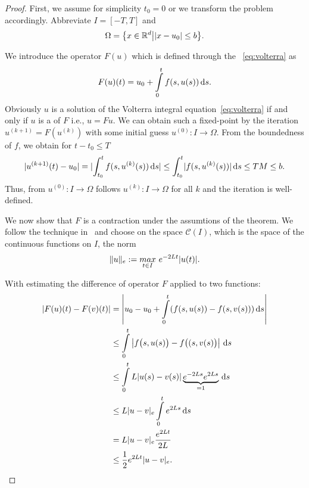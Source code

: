 

\begin{proof}
  First, we assume for simplicity $t_0=0$ or we transform the problem
  accordingly. Abbreviate $I = [-T,T]$ and
  \begin{gather*}
    \Omega = \bigl\{x\in \mathbb R^d\big| \lvert x-u_0\rvert \le b \bigr\}.
  \end{gather*}

  We introduce the operator $F(u)$ which is defined
  through the ~\eqref{eq:volterra} as
  \begin{gather}
    \label{eq:awa:16}
   F(u)(t) = u_0 + \int\limits_{0}^t f(s,u(s)) \,\mathrm{d} s.
  \end{gather}
  Obviously $u$ is a solution of the Volterra integral
  equation~\eqref{eq:volterra} if and only if $u$ is a  of $F$ i.e., $u=Fu$. We can obtain such a fixed-point by
  the iteration $u^{(k+1)} = F(u^{(k)})$ with some initial guess
  $u^{(0)}:I\to\Omega$. From the boundedness of $f$, we obtain for
  $t-t_0 \le T$
  \begin{align*}
    \lvert u^{(k+1)}(t)-u_0\rvert = \lvert\int_{t_0}^t f(s,u^{(k)}(s))\,\mathrm{d} s\rvert \le \int_{t_0}^t
    \lvert f(s,u^{(k)}(s))\rvert\,\mathrm{d} s \le TM \le b.
  \end{align*}
  Thus, from $u^{(0)}:I\to\Omega$ follows $u^{(k)}:I\to\Omega$ for all
  $k$ and the iteration is well-defined.
  
  We now show that $F$ is a contraction under the assumtions of the
  theorem. We follow the technique
  in~\cite[\S117]{Heuser86} and choose on the space $\mathcal C(I)$,
  which is the space of the continuous functions on $I$, the norm
  \begin{gather*}
    \lVert u\rVert_e := \underset{t \in I}{max} ~e^{-2 L t} |u(t)|.
  \end{gather*}
  
  With estimating the difference of operator $F$ applied to two functions:
  \begin{align*}
    |F(u)(t) - F(v)(t)|
    & = \left| u_0 - u_0 + \int\limits_{0}^t (f(s,u(s)) - f(s,v(s))) \,\mathrm{d} s \right| \\
    & \le \int\limits_{0}^t \left| f\bigl(s,u(s)\bigr) - f\bigl((s,v(s)\bigr) \right| \,\mathrm{d} s \\
    & \le \int\limits_{0}^t L |u(s) - v(s)| \underbrace{e^{-2 L s} e^{2 L s}}_{= 1} \,\mathrm{d} s \\
    & \le L |u-v|_e \int\limits_{0}^t e^{2 L s} \,\mathrm{d} s \\
    & = L |u-v|_e \frac{e^{2 L t}}{2 L} \\
    & \le \frac12 e^{2 L t}|u-v|_e.
  \end{align*}


\end{proof}
